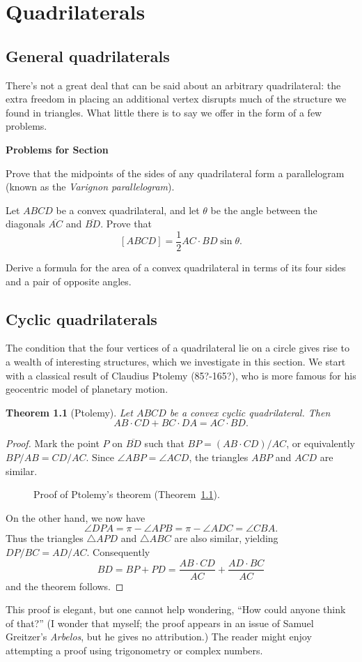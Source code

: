 \documentclass[12pt]{book}
\newcounter{exc}
\numberwithin{exc}{section}
\numberwithin{figure}{section}
\newenvironment{exer}{\vspace{0.1in}
\noindent \textbf{Problems for Section~\thesection} \vspace{0.1in}
\begin{list}{\arabic{exc}.}{\usecounter{exc}}}{\end{list}}
\newtheorem{theorem}{Theorem}[section]
\numberwithin{equation}{theorem}
\def\ii{\item}
\def\ang{\angle}
\def\half{\frac{1}{2}}
\def\seg#1{\overline{#1}}
\begin{document}

\chapter{Quadrilaterals}

\section{General quadrilaterals}
There's not a great deal that can be said about an arbitrary 
quadrilateral: the extra freedom in placing an additional vertex 
disrupts much of the structure we found in triangles. What little 
there is to say we offer in the form of a few problems.

\begin{exer}
\ii
Prove that the midpoints of the sides of any quadrilateral form a 
parallelogram (known as the \emph{Varignon parallelogram}).
\ii
Let $ABCD$ be a convex quadrilateral, and let $\theta$ be the angle 
between the diagonals $\seg{AC}$ and $\seg{BD}$. Prove that
\[
[ABCD] = \half AC \cdot BD \sin \theta.
\]
\ii
Derive a formula for the area of a convex quadrilateral in terms of 
its four sides and a pair of opposite angles.
\end{exer}

\section{Cyclic quadrilaterals}

The condition that the four vertices of a quadrilateral lie on a 
circle gives rise to a wealth of interesting structures, which we 
investigate in this section. We start with a classical result of 
Claudius Ptolemy (85?-165?), 
who is more famous for his geocentric model of planetary motion.

\begin{theorem}[Ptolemy] \label{thm:pt}
Let $ABCD$ be a convex cyclic quadrilateral. Then
\[
AB \cdot CD + BC \cdot DA = AC \cdot BD.
\]
\end{theorem}
\begin{proof}
Mark the point $P$ on $\seg{BD}$ such that $BP = (AB \cdot CD)/AC$, or 
equivalently $BP/AB = CD/AC$. Since $\ang ABP = \ang ACD$, the 
triangles $ABP$ and $ACD$ are similar.
\begin{figure}[ht]
\caption{Proof of Ptolemy's theorem (Theorem~\ref{thm:pt}).}
\label{fig:ptolemy}
\end{figure}

On the other hand, we now have
\[
\ang DPA = \pi - \ang APB = \pi - \ang ADC = \ang CBA.
\]
Thus the triangles $\triangle APD$ and $\triangle ABC$ 
are also similar, yielding $DP/BC = 
AD/AC$. Consequently
\[
BD = BP + PD = \frac{AB \cdot CD}{AC} + \frac{AD \cdot BC}{AC}
\]
and the theorem follows.
\end{proof}
This proof is elegant, but one cannot help wondering, ``How could 
anyone think of that?'' (I wonder that myself; the proof appears in an 
issue of Samuel Greitzer's \emph{Arbelos}, but he gives no 
attribution.) The reader might enjoy attempting a proof using 
trigonometry or complex numbers.
\end{document}

